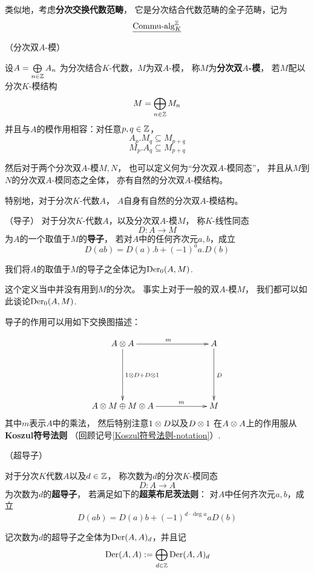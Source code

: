 类似地，考虑\textbf{分次交换代数范畴}，
它是分次结合代数范畴的全子范畴，记为
$$\underline{\operatorname{Commu}\!\text{-}\!\operatorname{alg}^{\mathbb{Z}}_{K}}$$

\begin{definition}（分次双$A$-模）

设$A=\bigoplus\limits_{n\in\mathbb{Z}}A_n$
为分次结合$K$-代数，$M$为双$A$-模，
称$M$为\textbf{分次双$A$-模}，
若$M$配以分次$K$-模结构
$$M=\bigoplus_{n\in\mathbb{Z}}M_n$$
并且与$A$的模作用相容：对任意$p,q\in\mathbb{Z}$，
$$A_p.M_q\subseteq M_{p+q}$$
$$M_p.A_q\subseteq M_{p+q}$$
\end{definition}

然后对于两个分次双$A$-模$M,N$，
也可以定义何为“分次双$A$-模同态”，
并且从$M$到$N$的分次双$A$-模同态之全体，
亦有自然的分次双$A$-模结构。

特别地，对于分次$K$-代数$A$，
$A$自身有自然的分次双$A$-模结构。


\begin{definition}（导子）
对于分次$K$-代数$A$，以及分次双$A$-模$M$，
称$K$-线性同态
$$D:A\to M$$
为$A$的一个取值于$M$的\textbf{导子}，
若对$A$中的任何齐次元$a,b$，成立
$$D(ab)=D(a).b+(-1)^a a.D(b)$$

我们将$A$的取值于$M$的导子之全体记为$\operatorname{Der}_0(A,M)$.
\end{definition}
这个定义当中并没有用到$M$的分次。
事实上对于一般的双$A$-模$M$，
我们都可以如此谈论$\operatorname{Der}_0(A,M)$.

导子的作用可以用如下交换图描述：

$$
  \xymatrixcolsep{5pc}
  \xymatrixrowsep{5pc}
  \xymatrix{
      A\ten A   \ar[r]^m    \ar[d]^{1\ten D+ D\ten 1}
    & A                     \ar[d]^D
  \\
      A\ten M\oplus M\ten A \ar[r]^-m
    & M
  }
$$
其中$m$表示$A$中的乘法，
然后特别注意$1\otimes D$以及$D\otimes 1$
在$A\otimes A$上的作用服从\textbf{Koszul符号法则}
（回顾记号\ref{Koszul符号法则-notation}）.



\begin{definition}（超导子）

对于分次$K$代数$A$以及$d\in\mathbb{Z}$，
称次数为$d$的分次$K$-模同态
$$D:A\to A$$
为次数为$d$的\textbf{超导子}，
若满足如下的\textbf{超莱布尼茨法则}：
对$A$中任何齐次元$a,b$，成立
$$D(ab)=D(a)b+(-1)^{d\cdot\deg a}aD(b)$$

记次数为$d$的超导子之全体为$\operatorname{Der}(A,A)_d$，并且记
$$\operatorname{Der}(A,A):=\bigoplus_{d\in\mathbb{Z}}\operatorname{Der}(A,A)_d$$
\end{definition}

